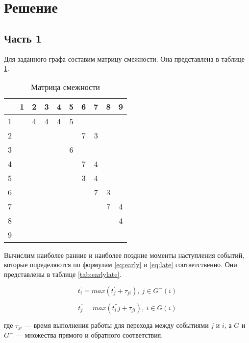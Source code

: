 \section{Решение}

\subsection{Часть 1}

Для заданного графа составим матрицу смежности. Она представлена в таблице \ref{tab:smezhnost}.

\begin{table}[H]
\begin{center}
	\def\tabcolsep{8pt}
	\caption{Матрица смежности}
	\label{tab:smezhnost}
	\begin{tabular}{|c|c|c|c|c|c|c|c|c|c|}
	\hline 
	 & 1 & 2 & 3 & 4 & 5 & 6 & 7 & 8 & 9 \\ 
	\hline 
	1 &  & 4 & 4 & 4 & 5 &  &  &  &  \\ 
	\hline 
	2 &  &  &  &  &  & 7 & 3 &  &  \\ 
	\hline 
	3 &  &  &  &  & 6 &  &  &  &  \\ 
	\hline 
	4 &  &  &  &  &  & 7 & 4 &  &  \\ 
	\hline 
	5 &  &  &  &  &  & 3 & 4 &  &  \\ 
	\hline 
	6 &  &  &  &  &  &  & 7 & 3 &  \\ 
	\hline 
	7 &  &  &  &  &  &  &  & 7 & 4 \\ 
	\hline 
	8 &  &  &  &  &  &  &  &  & 4 \\ 
	\hline 
	9 &  &  &  &  &  &  &  &  &  \\ 
	\hline 
	\end{tabular} 
\end{center}
\end{table}

Вычислим наиболее ранние и наиболее поздние моменты наступления событий, которые определяются по формулам \ref{eq:early} и \ref{eq:late} соответственно. Они представлены в таблице \ref{tab:earlylate}.

\begin{equation}
\label{eq:early}
	t^{'}_i = max (t^{'}_j + \tau_{ji}),\ j \in G^-(i)
\end{equation}

\begin{equation}
\label{eq:late}
	t^{''}_j = max (t^{''}_ij + \tau_{ji}),\ i \in G(i)
\end{equation}

где $\tau_{ji}$ --- время выполнения работы для перехода между событиями $j$ и $i$, а $G$ и $G^{-}$ ---  множества прямого и обратного соответствия.

